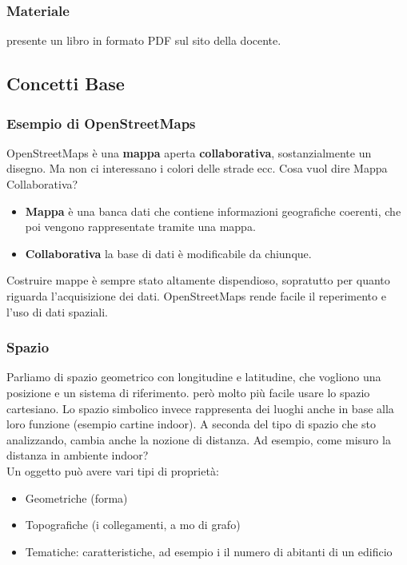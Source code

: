 \documentclass[a4paper,12pt]{article}
\begin{document}
\subsubsection{Materiale}
\E presente un libro in formato PDF sul sito della docente.


\subsection{Concetti Base}
\subsubsection{Esempio di OpenStreetMaps}
OpenStreetMaps è una \textbf{mappa} aperta \textbf{collaborativa}, sostanzialmente un disegno. Ma non ci interessano i colori delle strade ecc. Cosa vuol dire Mappa Collaborativa?
\begin{itemize}
 \item \textbf{Mappa} è una banca dati che contiene informazioni geografiche coerenti, che poi vengono rappresentate tramite una mappa.
 \item \textbf{Collaborativa} la base di dati è modificabile da chiunque.\\
\end{itemize}


Costruire mappe è sempre stato altamente dispendioso, sopratutto per quanto riguarda l'acquisizione dei dati. OpenStreetMaps rende facile il reperimento e l'uso di dati spaziali.

\subsubsection{Spazio}
Parliamo di spazio geometrico con longitudine e latitudine, che vogliono una posizione e un sistema di riferimento. \E però molto più facile usare lo spazio cartesiano. Lo spazio simbolico invece rappresenta dei luoghi anche in base alla loro funzione (esempio cartine indoor). A seconda del tipo di spazio che sto analizzando, cambia anche la nozione di distanza. Ad esempio, come misuro la distanza in ambiente indoor?\\
Un oggetto può avere vari tipi di proprietà:
\begin{itemize}
\item Geometriche (forma)
\item Topografiche (i collegamenti, a mo di grafo)
\item Tematiche: caratteristiche, ad esempio i il numero di abitanti di un edificio
\end{itemize}
\end{document}
